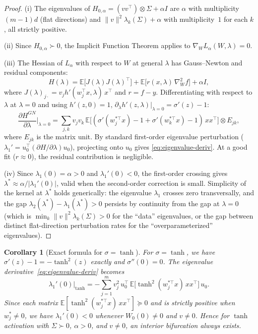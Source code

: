 \documentclass[11pt, reqno]{amsart}
\theoremstyle{plain}
\newtheorem{corollary}[theorem]{Corollary}
\theoremstyle{definition}
\theoremstyle{remark}
\begin{document}
\begin{proof}
(i) The eigenvalues of $H_{0,\alpha}=(vv^\top)\otimes\Sigma+\alpha I$ are $\alpha$ with multiplicity $(m-1)d$ (flat directions) and $\|v\|^2\lambda_k(\Sigma)+\alpha$ with multiplicity~$1$ for each $k$, all strictly positive.

(ii) Since $H_{0,\alpha}\succ 0$, the Implicit Function Theorem applies to $\nabla_W L_\alpha(W,\lambda)=0$.

(iii) The Hessian of $L_\alpha$ with respect to $W$ at general $\lambda$ has Gauss--Newton and residual components:
\begin{equation}
  H(\lambda)=\mathbb E\bigl[J(\lambda)J(\lambda)^\top\bigr]+\mathbb E\bigl[r(x,\lambda)\,\nabla_W^2 f\bigr]+\alpha I,
\end{equation}
where $J(\lambda)_{j\cdot}=v_j h'(w_j^\top x,\lambda)\,x^\top$ and $r=f-y$.
Differentiating with respect to $\lambda$ at $\lambda=0$ and using $h'(z,0)=1$, $\partial_\lambda h'(z,\lambda)\big|_{\lambda=0}=\sigma'(z)-1$:
\begin{equation}
  \frac{\partial H^{GN}}{\partial\lambda}\Big|_{\lambda=0}
  =\sum_{j,k}v_jv_k\,\mathbb E\bigl[(\sigma'(w_j^{*\top}\!x)-1+\sigma'(w_k^{*\top}\!x)-1)\,xx^\top\bigr]\otimes E_{jk},
\end{equation}
where $E_{jk}$ is the matrix unit.
By standard first-order eigenvalue perturbation ($\lambda_1'=u_0^\top(\partial H/\partial\lambda)u_0$), projecting onto $u_0$ gives \eqref{eq:eigenvalue-deriv}.  At a good fit ($r\approx 0$), the residual contribution is negligible.

(iv) Since $\lambda_1(0)=\alpha>0$ and $\lambda_1'(0)<0$, the first-order crossing gives $\lambda^*\approx \alpha/|\lambda_1'(0)|$, valid when the second-order correction is small.  Simplicity of the kernel at $\lambda^*$ holds generically: the eigenvalue $\lambda_1$ crosses zero transversally, and the gap $\lambda_2(\lambda^*)-\lambda_1(\lambda^*)>0$ persists by continuity from the gap at $\lambda=0$ (which is $\min_k\|v\|^2\lambda_k(\Sigma)>0$ for the ``data'' eigenvalues, or the gap between distinct flat-direction perturbation rates for the ``overparameterized'' eigenvalues).
\end{proof}

\begin{corollary}[Exact formula for $\sigma=\tanh$]\label{cor:tanh-formula}
For $\sigma=\tanh$, we have $\sigma'(z)-1=-\tanh^2(z)$ exactly and $\sigma''(0)=0$.  The eigenvalue derivative~\eqref{eq:eigenvalue-deriv} becomes
\begin{equation}\label{eq:lam-prime-tanh}
  \lambda_1'(0)\big|_{\tanh}=-\sum_{j=1}^m v_j^2\,u_0^\top\,\mathbb E\bigl[\tanh^2(w_j^{*\top}\!x)\,xx^\top\bigr]\,u_0.
\end{equation}
Since each matrix $\mathbb E[\tanh^2(w_j^{*\top}x)\,xx^\top]\succeq 0$ and is strictly positive when $w_j^*\neq 0$, we have $\lambda_1'(0)<0$ whenever $W_0(0)\neq 0$ and $v\neq 0$.  Hence for $\tanh$ activation with $\Sigma\succ 0$, $\alpha>0$, and $v\neq 0$, an interior bifurcation always exists.
\end{corollary}
\end{document}
